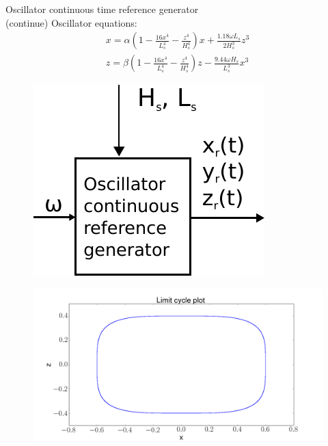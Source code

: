 \documentclass{beamer}
\begin{document}
\begin{frame}{Oscillator continuous time reference generator \\(continue)}
Oscillator equations:
\begin{align*}
x = \alpha (1 - \frac{16x^4}{L_s^4} - \frac{z^4}{H_s^4})x + \frac{1.18\omega L_s}{2H_s^3}z^3 \\
z = \beta (1 - \frac{16x^4}{L_s^4} - \frac{z^4}{H_s^4})z - \frac{9.44\omega H_s}{L_s^3}x^3
\end{align*}
\begin{figure}[t]
		\centering
		\begin{minipage}[t]{0.4\textwidth}
			\centering
			\includegraphics[width=0.6\linewidth]{images/Oscillator.pdf}\\
		\end{minipage}%
		\begin{minipage}[t]{0.6\textwidth}
			\vspace{-2.5cm}
			\centering
			\includegraphics[width=1\linewidth]{images/LimitCycle.png}\\
		\end{minipage}
\end{figure}
\end{frame}
\end{document}
